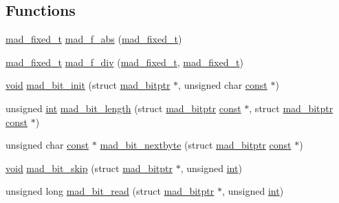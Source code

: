 \subsection*{Functions}
\begin{DoxyCompactItemize}
\item 
\hyperlink{libmad_2fixed_8h_a8a4b50d6d4d6827b7a8c871db1cbfd78}{mad\+\_\+fixed\+\_\+t} \hyperlink{lib-src_2libmad_2msvc_09_09_2mad_8h_a466c2db0842244c4f7770db941c56029}{mad\+\_\+f\+\_\+abs} (\hyperlink{libmad_2fixed_8h_a8a4b50d6d4d6827b7a8c871db1cbfd78}{mad\+\_\+fixed\+\_\+t})
\item 
\hyperlink{libmad_2fixed_8h_a8a4b50d6d4d6827b7a8c871db1cbfd78}{mad\+\_\+fixed\+\_\+t} \hyperlink{lib-src_2libmad_2msvc_09_09_2mad_8h_a293b1aa0fd7234bb7cfe48528a5c91b1}{mad\+\_\+f\+\_\+div} (\hyperlink{libmad_2fixed_8h_a8a4b50d6d4d6827b7a8c871db1cbfd78}{mad\+\_\+fixed\+\_\+t}, \hyperlink{libmad_2fixed_8h_a8a4b50d6d4d6827b7a8c871db1cbfd78}{mad\+\_\+fixed\+\_\+t})
\item 
\hyperlink{sound_8c_ae35f5844602719cf66324f4de2a658b3}{void} \hyperlink{lib-src_2libmad_2msvc_09_09_2mad_8h_a5cb09e97beb649283dc9de7f35dc0344}{mad\+\_\+bit\+\_\+init} (struct \hyperlink{structmad__bitptr}{mad\+\_\+bitptr} $\ast$, unsigned char \hyperlink{getopt1_8c_a2c212835823e3c54a8ab6d95c652660e}{const} $\ast$)
\item 
unsigned \hyperlink{xmltok_8h_a5a0d4a5641ce434f1d23533f2b2e6653}{int} \hyperlink{lib-src_2libmad_2msvc_09_09_2mad_8h_a5fe08816cab8812f2c67755cd857efde}{mad\+\_\+bit\+\_\+length} (struct \hyperlink{structmad__bitptr}{mad\+\_\+bitptr} \hyperlink{getopt1_8c_a2c212835823e3c54a8ab6d95c652660e}{const} $\ast$, struct \hyperlink{structmad__bitptr}{mad\+\_\+bitptr} \hyperlink{getopt1_8c_a2c212835823e3c54a8ab6d95c652660e}{const} $\ast$)
\item 
unsigned char \hyperlink{getopt1_8c_a2c212835823e3c54a8ab6d95c652660e}{const} $\ast$ \hyperlink{lib-src_2libmad_2msvc_09_09_2mad_8h_a9fc6c68afe35a50264107280814c5f43}{mad\+\_\+bit\+\_\+nextbyte} (struct \hyperlink{structmad__bitptr}{mad\+\_\+bitptr} \hyperlink{getopt1_8c_a2c212835823e3c54a8ab6d95c652660e}{const} $\ast$)
\item 
\hyperlink{sound_8c_ae35f5844602719cf66324f4de2a658b3}{void} \hyperlink{lib-src_2libmad_2msvc_09_09_2mad_8h_a09ebe709118c8ab4c3fc9678c0ce67a6}{mad\+\_\+bit\+\_\+skip} (struct \hyperlink{structmad__bitptr}{mad\+\_\+bitptr} $\ast$, unsigned \hyperlink{xmltok_8h_a5a0d4a5641ce434f1d23533f2b2e6653}{int})
\item 
unsigned long \hyperlink{lib-src_2libmad_2msvc_09_09_2mad_8h_a691bcc7fa9b862661689da7744c1c0b3}{mad\+\_\+bit\+\_\+read} (struct \hyperlink{structmad__bitptr}{mad\+\_\+bitptr} $\ast$, unsigned \hyperlink{xmltok_8h_a5a0d4a5641ce434f1d23533f2b2e6653}{int})

\end{DoxyCompactItemize}

